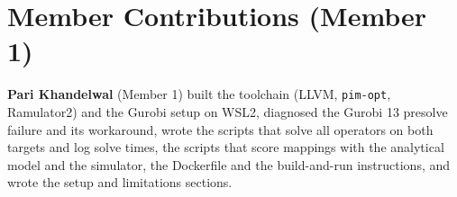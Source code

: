 \section*{Member Contributions (Member 1)}
\textbf{Pari Khandelwal} (Member 1) built the toolchain (LLVM, \texttt{pim-opt},
Ramulator2) and the Gurobi setup on WSL2, diagnosed the Gurobi 13 presolve
failure and its workaround, wrote the scripts that solve all operators on both
targets and log solve times, the scripts that score mappings with the analytical
model and the simulator, the Dockerfile and the build-and-run instructions, and
wrote the setup and limitations sections.
